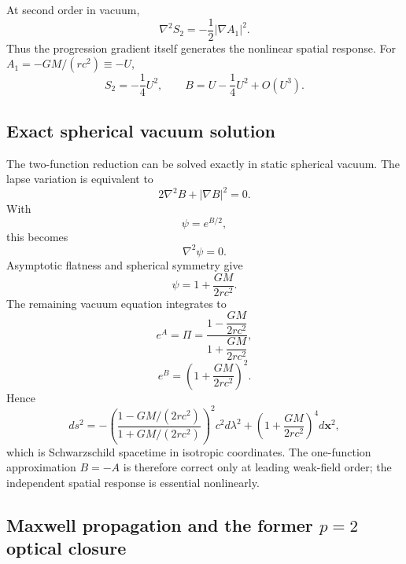 \documentclass[11pt]{article}
\begin{document}
At second order in vacuum,
\begin{equation}
    \boxed{
    \nabla^2S_2=-\frac12|\nabla A_1|^2.}
    \label{eq:S2}
\end{equation}
Thus the progression gradient itself generates the nonlinear spatial response. For $A_1=-GM/(rc^2)\equiv-U$,
\begin{equation}
    S_2=-\frac14U^2,
    \qquad
    B=U-\frac14U^2+O(U^3).
\end{equation}

\subsection{Exact spherical vacuum solution}

The two-function reduction can be solved exactly in static spherical vacuum. The lapse variation is equivalent to
\begin{equation}
    2\nabla^2B+|\nabla B|^2=0.
\end{equation}
With
\begin{equation}
    \psi=e^{B/2},
\end{equation}
this becomes
\begin{equation}
    \nabla^2\psi=0.
\end{equation}
Asymptotic flatness and spherical symmetry give
\begin{equation}
    \psi=1+\frac{GM}{2rc^2}.
\end{equation}
The remaining vacuum equation integrates to
\begin{equation}
    \boxed{
    e^A=\Pi
    =\frac{1-\dfrac{GM}{2rc^2}}
           {1+\dfrac{GM}{2rc^2}},}
    \label{eq:Pi_exact}
\end{equation}
\begin{equation}
    \boxed{
    e^B=\left(1+\frac{GM}{2rc^2}\right)^2.}
    \label{eq:B_exact}
\end{equation}
Hence
\begin{equation}
    ds^2=-\left(
    \frac{1-GM/(2rc^2)}{1+GM/(2rc^2)}
    \right)^2c^2d\lambda^2
    +\left(1+\frac{GM}{2rc^2}\right)^4d\mathbf x^2,
    \label{eq:schwarzschild_iso}
\end{equation}
which is Schwarzschild spacetime in isotropic coordinates. The one-function approximation $B=-A$ is therefore correct only at leading weak-field order; the independent spatial response is essential nonlinearly.

\subsection{Maxwell propagation and the former \texorpdfstring{$p=2$}{p=2} optical closure}
\end{document}

